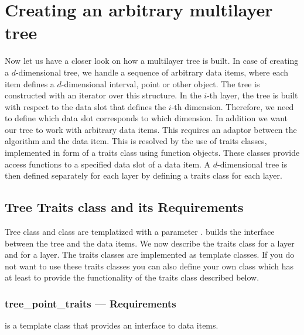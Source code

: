 \section{Creating an arbitrary multilayer tree}
\label{general}

Now let us have a closer look on how a multilayer tree is built.
In case of creating a $d$-dimensional tree,  we handle a
sequence of arbitrary data
items, where each item  defines a $d$-dimensional interval, point
or other object. The tree is constructed with an iterator over
this structure. In the $i$-th layer, the tree is
built with respect to the data slot that defines the $i$-th
dimension. Therefore, we need to define which data slot
corresponds to which dimension.
In addition we want our tree to work with arbitrary data items.
This requires an
adaptor between the algorithm and the data item. This is resolved
by the use of traits classes, implemented in
form of a traits class using
function objects.
These classes provide
access functions to a specified data slot of a data item.
A $d$-dimensional tree is then defined separately for each layer by
defining a traits class for each layer.

\subsection{Tree Traits class and its Requirements}
\label{TreeInterface}

Tree class  and class
 are templatized with a parameter
.  builds the
interface between the tree and the data items. We now describe
the traits class for a  layer and for a
 layer. The traits classes are implemented as
template classes. If you do not want to use these traits classes you
can also define your own class which has at least to provide
the functionality of the traits class described below.


\subsubsection{tree\_point\_traits --- Requirements}

\ccDefinition
{} is a template class
that provides an interface to data items.


